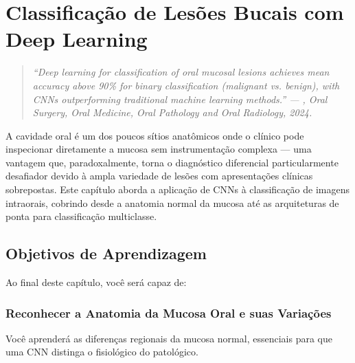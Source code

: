 
\chapter{Classificação de Lesões Bucais com Deep Learning}
\label{cap:lesoes-bucais}

\niveltres

\begin{quote}
\itshape\small
``Deep learning for classification of oral mucosal lesions achieves mean accuracy
above 90\% for binary classification (malignant vs. benign), with CNNs outperforming
traditional machine learning methods.'' --- , Oral Surgery,
Oral Medicine, Oral Pathology and Oral Radiology, 2024.
\end{quote}

A cavidade oral é um dos poucos sítios anatômicos onde o clínico pode inspecionar
diretamente a mucosa sem instrumentação complexa --- uma vantagem que, paradoxalmente,
torna o diagnóstico diferencial particularmente desafiador devido à ampla variedade
de lesões com apresentações clínicas sobrepostas. Este capítulo aborda a aplicação
de CNNs à classificação de imagens intraorais, cobrindo desde a anatomia normal
da mucosa até as arquiteturas de ponta para classificação multiclasse.


\section{Objetivos de Aprendizagem}

Ao final deste capítulo, você será capaz de:

\subsection{Reconhecer a Anatomia da Mucosa Oral e suas Variações}
Você aprenderá as diferenças regionais da mucosa normal, essenciais para que uma CNN distinga o fisiológico do patológico.

